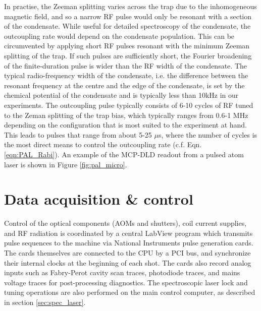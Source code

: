 	In practise, the Zeeman splitting varies across the trap due to the inhomogeneous magnetic field, and so a narrow RF pulse would only be resonant with a section of the condensate.
	While useful for detailed spectroscopy of the condensate, the outcoupling rate would depend on the condensate population.
	This can be circumvented by applying short RF pulses resonant with the minimum Zeeman splitting of the trap.
	If such pulses are sufficiently short, the Fourier broadening of the finite-duration pulse is wider than the RF width of the condensate.
	The typical radio-frequency width of the condensate, i.e.
	the difference between the resonant frequency at the centre and the edge of the condensate, is set by the chemical potential of the condensate and is typically less than 10kHz in our experiments.
	The outcoupling pulse typically consists of 6-10 cycles of RF tuned to the Zeman splitting of the trap bias, which typically ranges from 0.6-1 MHz depending on the configuration that is most suited to the experiment at hand. 
	This leads to pulses that range from about 5-25 $\mu$s, where the number of cycles is the most direct means to control the outcoupling rate (c.f. Eqn. \ref{eqn:PAL_Rabi}).
	An example of the MCP-DLD readout from a pulsed atom laser is shown in Figure \ref{fig:pal_micro}.

	
	
	



% 




	


\section{Data acquisition \& control}
\label{sec:DAQ}
	
	Control of the optical components (AOMs and shutters), coil current supplies, and RF radiation is coordinated by a central LabView program which transmits pulse sequences to the machine via National Instruments pulse generation cards.
	The cards themselves are connected to the CPU by a PCI bus, and synchronize their internal clocks at the beginning of each shot.
	The cards also record analog inputs such as Fabry-Perot cavity scan traces, photodiode traces, and mains voltage traces for post-processing diagnostics.
	The spectroscopic laser lock and tuning operations are also performed on the main control computer, as described in section \ref{sec:spec_laser}.

